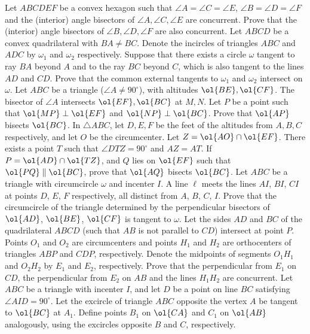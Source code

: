 \documentclass{seto}
\begin{document}
\exercise[EGMO 2020/3] Let $ABCDEF$ be a convex hexagon such that $\angle
A=\angle C=\angle E$, $\angle B=\angle D=\angle F$ and the (interior) angle
bisectors of $\angle A,\angle C,\angle E$ are concurrent. Prove that the
(interior) angle bisectors of $\angle B,\angle D,\angle F$ are also concurrent.
\exercise[IMO 2008/6]Let $ ABCD$ be a convex quadrilateral with $ BA\neq BC$.
Denote the incircles of triangles $ ABC$ and $ ADC$ by $ \omega_1$ and $
\omega_2$ respectively. Suppose that there exists a circle $ \omega$ tangent to
ray $ BA$ beyond $ A$ and to the ray $ BC$ beyond $ C$, which is also tangent to
the lines $ AD$ and $ CD$. Prove that the common external tangents to $
\omega_1$ and $\omega_2$ intersect on $ \omega$. 
Let $ABC$ be a triangle ($\angle A\neq 90^\circ$),
with altitudes $\ol{BE},\ol{CF}$. The bisector of $\angle A$ intersects
$\ol{EF},\ol{BC}$ at $M,N$. Let $P$ be a point such that $\ol{MP}\perp\ol{EF}$
and $\ol{NP}\perp\ol{BC}$. Prove that $\ol{AP}$ bisects $\ol{BC}$.
In $\triangle ABC$, let $D,E, F$ be the feet of the
altitudes from $A,B,C$ respectively, and let $O$ be the circumcenter. Let
$Z=\ol{AO}\cap\ol{EF}$. There exists a point $T$ such that $\angle DTZ=90^\circ$
and $AZ=AT.$ If $P=\ol{AD}\cap\ol{TZ}$, and $Q$ lies on $\ol{EF}$ such that
$\ol{PQ}\parallel\ol{BC}$, prove that $\ol{AQ}$ bisects $\ol{BC}$. 
\exercise[SL 2018/G5] Let $ABC$ be a triangle with circumcircle $\omega$ and
incenter $I$. A line $\ell$ meets the lines $AI$, $BI$, $CI$ at points $D$, $E$,
$F$ respectively, all distinct from $A$, $B$, $C$, $I$. Prove that the
circumcircle of the triangle determined by the perpendicular bisectors of
$\ol{AD}$, $\ol{BE}$, $\ol{CF}$ is tangent to $\omega$. 
\exercise[SL 2009/G6] Let the sides $AD$ and $BC$ of the quadrilateral $ABCD$
(such that $AB$ is not parallel to $CD$) intersect at point $P$. Points $O_1$
and $O_2$ are circumcenters and points $H_1$ and $H_2$ are orthocenters of
triangles $ABP$ and $CDP$, respectively. Denote the midpoints of segments
$O_1H_1$ and $O_2H_2$ by $E_1$ and $E_2$, respectively. Prove that the
perpendicular from $E_1$ on $CD$, the perpendicular from $E_2$ on $AB$ and the
lines $H_1H_2$ are concurrent.
Let $ABC$ be a triangle with incenter $I$,
and let $D$ be a point on line $BC$ satisfying $\angle AID=90^{\circ}$. Let the
excircle of triangle $ABC$ opposite the vertex $A$ be tangent to $\ol{BC}$
at $A_1$. Define points $B_1$ on $\ol{CA}$ and $C_1$ on $\ol{AB}$
analogously, using the excircles opposite $B$ and $C$, respectively.
\end{document}
